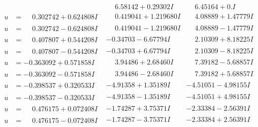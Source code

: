 \documentclass[1p]{elsarticle_modified}
\theoremstyle{definition}
\begin{document}
$$\begin{array}{c|c|c}
 & \phantom{-}6.58142 + 0.29302 I & \phantom{-}6.45164 + 0. I\phantom{ +0.000000I} \\ \hline\begin{aligned}
u &= \phantom{-}0.302742 + 0.624808 I\end{aligned}
 & \phantom{-}0.419041 + 1.219680 I & \phantom{-}4.08889 + 1.47779 I \\ \hline\begin{aligned}
u &= \phantom{-}0.302742 - 0.624808 I\end{aligned}
 & \phantom{-}0.419041 - 1.219680 I & \phantom{-}4.08889 - 1.47779 I \\ \hline\begin{aligned}
u &= \phantom{-}0.407807 + 0.544208 I\end{aligned}
 & -0.34703 - 6.67794 I & \phantom{-}2.10309 + 8.18225 I \\ \hline\begin{aligned}
u &= \phantom{-}0.407807 - 0.544208 I\end{aligned}
 & -0.34703 + 6.67794 I & \phantom{-}2.10309 - 8.18225 I \\ \hline\begin{aligned}
u &= -0.363092 + 0.571858 I\end{aligned}
 & \phantom{-}3.94486 + 2.68460 I & \phantom{-}7.39182 - 5.68857 I \\ \hline\begin{aligned}
u &= -0.363092 - 0.571858 I\end{aligned}
 & \phantom{-}3.94486 - 2.68460 I & \phantom{-}7.39182 + 5.68857 I \\ \hline\begin{aligned}
u &= -0.398537 + 0.320533 I\end{aligned}
 & -4.91358 + 1.35189 I & -4.51051 - 4.98155 I \\ \hline\begin{aligned}
u &= -0.398537 - 0.320533 I\end{aligned}
 & -4.91358 - 1.35189 I & -4.51051 + 4.98155 I \\ \hline\begin{aligned}
u &= \phantom{-}0.476175 + 0.072408 I\end{aligned}
 & -1.74287 + 3.75371 I & -2.33384 - 2.56391 I \\ \hline\begin{aligned}
u &= \phantom{-}0.476175 - 0.072408 I\end{aligned}
 & -1.74287 - 3.75371 I & -2.33384 + 2.56391 I \\ \hline\begin{aligned}

\end{aligned}
\end{array}$$
\end{document}
